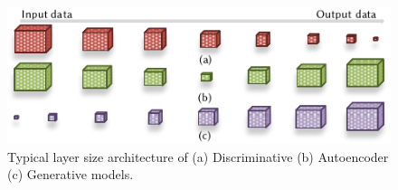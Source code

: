 \begin{figure}
\includegraphics{architectures_layer_size}
\caption{Typical layer size architecture of (a) Discriminative (b) Autoencoder (c) Generative models.}
\label{fig:DNN_category}
\end{figure}

